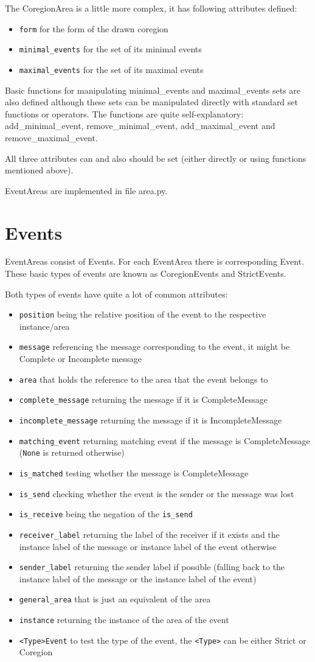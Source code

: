 \documentclass[11pt,oneside]{fithesis2}
\newcommand{\T}[1]{\texttt{#1}}
\newcommand{\ite}[1]{\item{\texttt{#1}}}
\begin{document}
The CoregionArea is a little more complex, it has following attributes defined:
\begin{itemize}
\ite{form} for the form of the drawn coregion
\ite{minimal\_events} for the set of its minimal events
\ite{maximal\_events} for the set of its maximal events
\end{itemize}

Basic functions for manipulating minimal\_events and maximal\_events sets are also defined although these sets can be manipulated directly with standard set functions or operators. The functions are quite self-explanatory: add\_minimal\_event, remove\_minimal\_event, add\_maximal\_event and remove\_maximal\_event.

All three attributes can and also should be set (either directly or using functions mentioned above).

EventAreas are implemented in file area.py.


\section{Events}
EventAreas consist of  Events. For each EventArea there is corresponding Event. These basic types of events are known as CoregionEvents and StrictEvents.

Both types of events have quite a lot of common attributes:
\begin{itemize}
\ite{position} being the relative position of the event to the respective instance/area
\ite{message} referencing the message corresponding to the event, it might be Complete or Incomplete message
\ite{area} that holds the reference to the area that the event belongs to
\ite{complete\_message} returning the message if it is CompleteMessage
\ite{incomplete\_message} returning the message if it is IncompleteMessage
\ite{matching\_event} returning matching event if the message is CompleteMessage (\T{None} is returned otherwise)
\ite{is\_matched} testing whether the message is CompleteMessage
\ite{is\_send} checking whether the event is the sender or the message was lost
\ite{is\_receive} being the negation of the \T{is\_send}
\ite{receiver\_label} returning the label of the receiver if it exists and the instance label of the message or instance label of the event otherwise
\ite{sender\_label} returning the sender label if possible (falling back to the instance label of the message or the instance label of the event)
\ite{general\_area} that is just an equivalent of the area
\ite{instance} returning the instance of the area of the event
\ite{<Type>Event} to test the type of the event, the \T{<Type>} can be either Strict or Coregion
\end{itemize}
\end{document}
